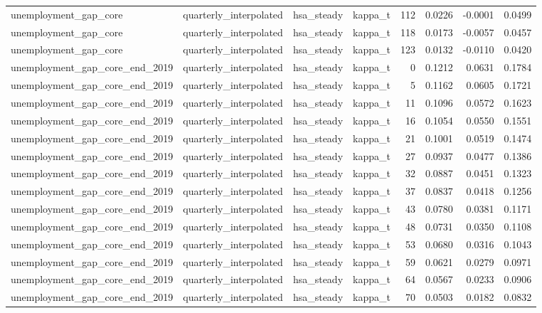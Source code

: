 \begin{tabular}{llllrrrr}
unemployment\_gap\_core & quarterly\_interpolated & hsa\_steady & kappa\_t & 112 & 0.0226 & -0.0001 & 0.0499 \\
unemployment\_gap\_core & quarterly\_interpolated & hsa\_steady & kappa\_t & 118 & 0.0173 & -0.0057 & 0.0457 \\
unemployment\_gap\_core & quarterly\_interpolated & hsa\_steady & kappa\_t & 123 & 0.0132 & -0.0110 & 0.0420 \\
unemployment\_gap\_core\_end\_2019 & quarterly\_interpolated & hsa\_steady & kappa\_t & 0 & 0.1212 & 0.0631 & 0.1784 \\
unemployment\_gap\_core\_end\_2019 & quarterly\_interpolated & hsa\_steady & kappa\_t & 5 & 0.1162 & 0.0605 & 0.1721 \\
unemployment\_gap\_core\_end\_2019 & quarterly\_interpolated & hsa\_steady & kappa\_t & 11 & 0.1096 & 0.0572 & 0.1623 \\
unemployment\_gap\_core\_end\_2019 & quarterly\_interpolated & hsa\_steady & kappa\_t & 16 & 0.1054 & 0.0550 & 0.1551 \\
unemployment\_gap\_core\_end\_2019 & quarterly\_interpolated & hsa\_steady & kappa\_t & 21 & 0.1001 & 0.0519 & 0.1474 \\
unemployment\_gap\_core\_end\_2019 & quarterly\_interpolated & hsa\_steady & kappa\_t & 27 & 0.0937 & 0.0477 & 0.1386 \\
unemployment\_gap\_core\_end\_2019 & quarterly\_interpolated & hsa\_steady & kappa\_t & 32 & 0.0887 & 0.0451 & 0.1323 \\
unemployment\_gap\_core\_end\_2019 & quarterly\_interpolated & hsa\_steady & kappa\_t & 37 & 0.0837 & 0.0418 & 0.1256 \\
unemployment\_gap\_core\_end\_2019 & quarterly\_interpolated & hsa\_steady & kappa\_t & 43 & 0.0780 & 0.0381 & 0.1171 \\
unemployment\_gap\_core\_end\_2019 & quarterly\_interpolated & hsa\_steady & kappa\_t & 48 & 0.0731 & 0.0350 & 0.1108 \\
unemployment\_gap\_core\_end\_2019 & quarterly\_interpolated & hsa\_steady & kappa\_t & 53 & 0.0680 & 0.0316 & 0.1043 \\
unemployment\_gap\_core\_end\_2019 & quarterly\_interpolated & hsa\_steady & kappa\_t & 59 & 0.0621 & 0.0279 & 0.0971 \\
unemployment\_gap\_core\_end\_2019 & quarterly\_interpolated & hsa\_steady & kappa\_t & 64 & 0.0567 & 0.0233 & 0.0906 \\
unemployment\_gap\_core\_end\_2019 & quarterly\_interpolated & hsa\_steady & kappa\_t & 70 & 0.0503 & 0.0182 & 0.0832 \\

\end{tabular}
